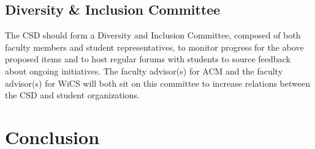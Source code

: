 \documentclass{article}
\begin{document}
\subsection{Diversity \& Inclusion Committee} 
The CSD should form a Diversity and Inclusion Committee, composed of both faculty members and 
student representatives, to monitor progress for the above proposed items and to host regular forums with 
students to source feedback about ongoing initiatives. The faculty advisor(s) for ACM and the faculty advisor(s)
for WiCS will both sit on this committee to increase relations between the CSD and student organizations. 

\section{Conclusion}\label{conclusion}
\end{document}

